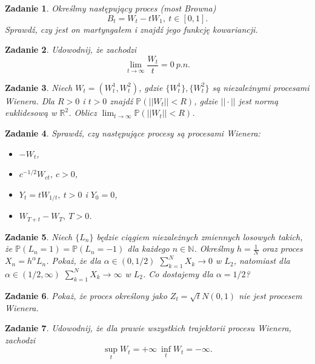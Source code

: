 \documentclass{mwart}
\newtheorem{zd}{Zadanie}
\begin{document}
\begin{zd}
	Określmy następujący proces (most Browna)
	\begin{displaymath}
		B_t = W_t - tW_1, \ t\in[0,1].
	\end{displaymath}
	Sprawdź, czy jest on martyngałem i znajdź jego funkcję kowariancji.
\end{zd}
\begin{zd}
	Udowodnij, że zachodzi
	\begin{displaymath}
	\lim_{t \to \infty}\frac{W_t}{t} = 0\ p.n.
	\end{displaymath}
\end{zd}
\begin{zd}
	Niech $W_t = (W_t^1, W_t^2)$, gdzie $\{W_t^1\}, \{W_t^2\}$ są niezależnymi procesami Wienera. Dla $R > 0$ i $t > 0$ znajdź $\mathbb{P}\left(||W_t|| < R	\right)$, gdzie $||\cdot||$ jest normą euklidesową w $\mathbb{R}^2$. Oblicz $\lim_{t \to \infty}\mathbb{P}\left(||W_t|| < R	\right)$.
\end{zd}
\begin{zd}
	Sprawdź, czy następujące procesy są procesami Wienera:
	\begin{itemize}
		\item $-W_t$,
		\item $c^{-1/2}W_{ct}$, $c>0$,
		\item $Y_t = tW_{1/t},\ t> 0$ i $Y_0 = 0$,
		\item $W_{T+t} - W_T, \ T > 0$.
	\end{itemize}
\end{zd}
\begin{zd}
	Niech $\{L_n\}$ będzie ciągiem niezależnych zmiennych losowych takich, że $\mathbb{P}\left(L_n = 1\right) = \mathbb{P}\left(L_n = -1\right)$ dla każdego $n\in\mathbb{N}$. Określmy $h = \frac{1}{N}$ oraz proces $X_n = h^{\alpha}L_n$. Pokaż, że dla $\alpha \in (0,1/2)$ $\sum_{k=1}^NX_k \to 0$ w $L_2$, natomiast dla $\alpha \in (1/2, \infty)$ $\sum_{k=1}^NX_k \to \infty$ w $L_2$. Co dostajemy dla $\alpha = 1/2$?
\end{zd}

\begin{zd}
	Pokaż, że proces określony jako $Z_t = \sqrt{t}N(0,1)$ nie jest procesem Wienera.
\end{zd}
\begin{zd}
	Udowodnij, że dla prawie wszystkich trajektorii procesu Wienera, zachodzi
	\begin{displaymath}
		\sup_tW_t = +\infty\ \inf_tW_t = -\infty.
	\end{displaymath}
\end{zd}
\end{document}
